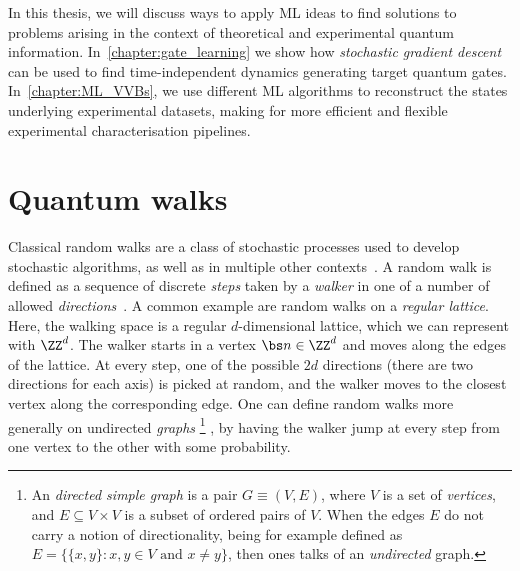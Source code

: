 In this thesis, we will discuss ways to apply ML ideas to find solutions to problems arising in the context of theoretical and experimental quantum information.
In~\cref{chapter:gate_learning} we show how \emph{stochastic gradient descent} can be used to find time-independent dynamics generating target quantum gates.
In~\cref{chapter:ML_VVBs}, we use different ML algorithms to reconstruct the states underlying experimental datasets, making for more efficient and flexible experimental characterisation pipelines.


\section{Quantum walks}
\label{sec:intro:QWs}

Classical random walks are a class of stochastic processes used to develop stochastic algorithms, as well as in multiple other contexts~\cite{berg1993random,fama1995random,motwani1995randomized,hughes1996random,schoning1999probabilistic,codling2008random}.
A random walk is defined as a sequence of discrete \textit{steps} taken by a \textit{walker} in one of a number of allowed \emph{directions}~\cite{lovasz1993random}.
A common example are random walks on a \textit{regular lattice}. Here, the walking space is a regular $d$-dimensional lattice, which we can represent with $\ZZ^d$. The walker starts in a vertex $\bs n\in\ZZ^d$ and moves along the edges of the lattice.
At every step, one of the possible $2d$ directions (there are two directions for each axis) is picked at random, and the walker moves to the closest vertex along the corresponding edge.
One can define random walks more generally on undirected \textit{graphs}
\footnote{An \textit{directed simple graph} is a pair $G\equiv (V,E)$, where $V$ is a set of \textit{vertices}, and $E\subseteq V\times V$ is a subset of ordered pairs of $V$. When the edges $E$ do not carry a notion of directionality, being for example defined as $E=\{\{x,y\} : x,y\in V\text{ and }x\neq y\}$, then ones talks of an \textit{undirected} graph.}
, by having the walker jump at every step from one vertex to the other with some probability.

